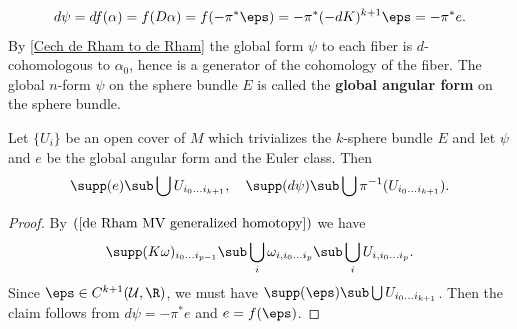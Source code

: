 \begin{align*}
d\psi=df(\alpha)=f(D\alpha)=f(-\pi^*\eps)=-\pi^*(-dK)^{k+1}\eps=-\pi^*e.
\end{align*}
By \cref{Cech de Rham to de Rham} the global form $\psi$ to each fiber is $d$-cohomologous to $\alpha_0$, hence is a generator of the cohomology of the fiber. 
The global $n$-form $\psi$ on the sphere bundle $E$ is called the \textbf{global angular form} on the sphere bundle.
\begin{proposition}\label{sphere bundle Euler class supp}
Let $\{U_i\}$ be an open cover of $M$ which trivializes the $k$-sphere bundle $E$ and let $\psi$ and $e$ be the global angular form and the Euler class. Then
\[\supp(e)\sub\bigcup U_{i_0\dots i_{k+1}},\quad \supp(d\psi)\sub\bigcup\pi^{-1}(U_{i_0\dots i_{k+1}}).\]
\end{proposition}
\begin{proof}
By $(\ref{de Rham MV generalized homotopy})$ we have
\[\supp(K\omega)_{i_0\dots i_{p-1}}\sub\bigcup_i\omega_{i,i_0\dots i_p}\sub\bigcup_{i}U_{i,i_0\dots i_p}.\]
Since $\eps\in C^{k+1}(\mathcal{U},\R)$, we must have $\supp(\eps)\sub\bigcup U_{i_0\dots i_{k+1}}$. Then the claim follows from $d\psi=-\pi^*e$ and $e=f(\eps)$.
\end{proof}
